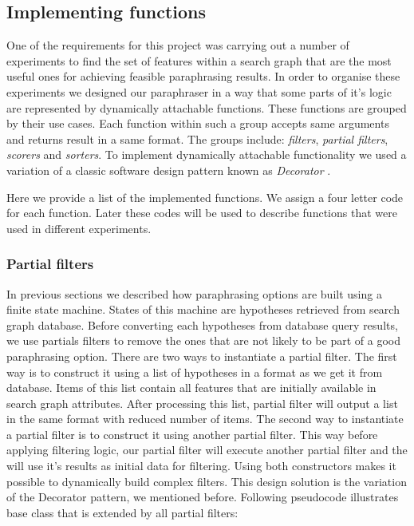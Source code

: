 \subsection{Implementing functions}

One of the requirements for this project was carrying out a number of experiments to find the set of features within a search graph that are the most useful ones for achieving feasible paraphrasing results. In order to organise these experiments we designed our paraphraser in a way that some parts of it's logic are represented by dynamically attachable functions. These functions are grouped by their use cases. Each function within such a group accepts same arguments and returns result in a same format. The groups include: \emph{filters}, \emph{partial filters}, \emph{scorers} and \emph{sorters}. To implement dynamically attachable functionality we used a variation of a classic software design pattern known as \emph{Decorator} \cite{vlissides1995design}.

Here we provide a list of the implemented functions. We assign a four letter code for each function. Later these codes will be used to describe functions that were used in different experiments.

\subsubsection{Partial filters}

In previous sections we described how paraphrasing options are built using a finite state machine. States of this machine are hypotheses retrieved from search graph database. Before converting each hypotheses from database query results, we use partials filters to remove the ones that are not likely to be part of a good paraphrasing option. There are two ways to instantiate a partial filter. The first way is to construct it using a list of hypotheses in a format as we get it from database. Items of this list contain all features that are initially available in search graph attributes. After processing this list, partial filter will output a list in the same format with reduced number of items. The second way to instantiate a partial filter is to construct it using another partial filter. This way before applying filtering logic, our partial filter will execute another partial filter and the will use it's results as initial data for filtering. Using both constructors makes it possible to dynamically build complex filters. This design solution is the variation of the Decorator pattern, we mentioned before. Following pseudocode illustrates base class that is extended by all partial filters:

